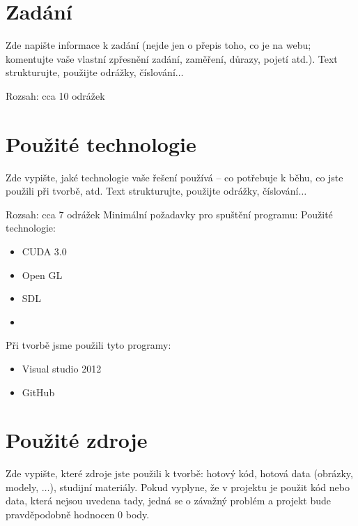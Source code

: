 \documentclass[11pt,a4paper]{article}
\begin{document}
\titlepageandcontents

\section{Zadání}

Zde napište informace k zadání (nejde jen o přepis toho, co je na webu;
komentujte vaše vlastní zpřesnění zadání, zaměření, důrazy, pojetí atd.). Text
strukturujte, použijte odrážky, číslování$\ldots$

Rozsah: cca 10 odrážek

\section{Použité technologie}

Zde vypište, jaké technologie vaše řešení používá – co potřebuje k běhu, co
jste použili při tvorbě, atd. Text strukturujte, použijte odrážky,
číslování$\ldots$

Rozsah: cca 7 odrážek
Minimální požadavky pro spuštění programu:
Použité technologie:
\begin{itemize}
\item CUDA 3.0
\item Open GL
\item SDL
\item 
\end{itemize}
Při tvorbě jsme použili tyto programy:
\begin{itemize}
\item Visual studio 2012
\item GitHub
\end{itemize}
\section{Použité zdroje}

Zde vypište, které zdroje jste použili k tvorbě: hotový kód, hotová data
(obrázky, modely, $\ldots$), studijní materiály. Pokud vyplyne, že v projektu
je použit kód nebo data, která nejsou uvedena tady, jedná se o závažný problém
a projekt bude pravděpodobně hodnocen 0 body.
\end{document}
